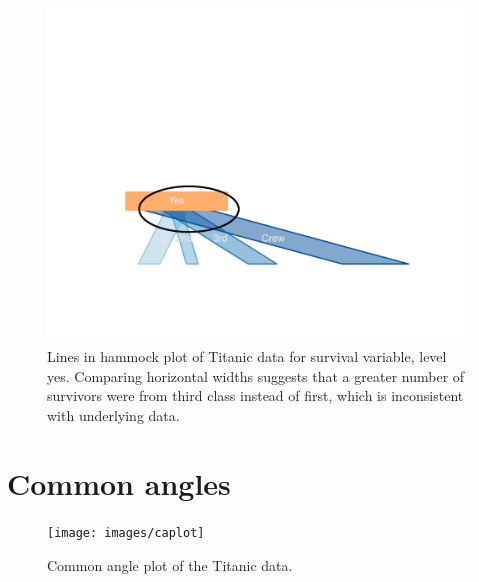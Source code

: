 \documentclass[journal]{vgtc}\usepackage{graphicx, color}
\newenvironment{knitrout}{}{} %
\begin{document}
\begin{figure}[htbp]
\centering
\includegraphics[width = .75\linewidth]{images/grid-hammock-zoom}
\caption{\label{hammock_zoom}Lines in hammock plot of Titanic data for survival variable, level yes. Comparing horizontal widths suggests that a greater number of survivors were from third class instead of first, which is inconsistent with underlying data.}
\end{figure}


%

\section{Common angles}





\begin{figure}[htbp] %
\begin{knitrout}
\color{fgcolor}

{\centering \texttt{[image: images/caplot]} 

}



\end{knitrout}

   \caption{ \label{fig:ca-titanic} Common angle plot of the Titanic data. }
  \end{figure}
\end{document}
